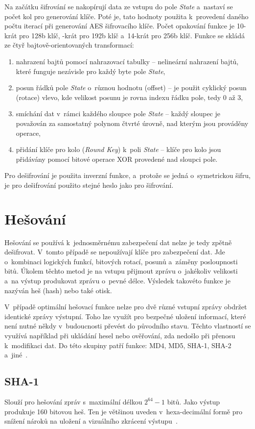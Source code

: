 Na začátku šifrování se nakopírují data ze vstupu do pole {\it State} a~nastaví se počet kol pro
generování klíče. Poté je, tato hodnoty použita k~provedení daného počtu iterací při generování AES
šifrovacího klíče. Počet opakování funkce je 10-krát pro 128b klíč, -krát pro 192b klíč a~14-krát
pro 256b klíč. Funkce se skládá ze čtyř bajtově-orientovaných transformací:
    \begin{enumerate}
    \item nahrazení bajtů pomocí nahrazovací tabulky -- nelineární nahrazení bajtů, které funguje
        nezávisle pro každý byte pole {\it State},
    \item posun řádků pole {\it State} o~různou hodnotu (offset) -- je použit cyklický posun
        (rotace) vlevo, kde velikost posunu je rovna indexu řádku pole, tedy 0 až 3,
    \item smíchání dat v~rámci každého sloupce pole {\it State} -- každý sloupec je považován za
        samostatný polynom čtvrté úrovně, nad kterým jsou prováděny operace,
    \item přidání klíče pro kolo ({\it Round Key}) k~poli {\it State} -- klíče pro kolo jsou
	přidávány pomocí bitové operace XOR provedené nad sloupci pole.
\end{enumerate}
Pro dešifrování je použita inverzní funkce, a~protože se jedná o~symetrickou šifru, je pro dešifrování
použito stejné heslo jako pro šifrování.

\section{Hešování}
Hešování se používá k~jednosměrnému zabezpečení dat nelze je tedy zpětně dešifrovat. V~tomto případě
se nepoužívají klíče pro zabezpečení dat. Jde o~kombinaci logických funkcí, bitových rotací, posunů
a~záměny posloupnosti bitů. Úkolem těchto metod je na vstupu přijmout zprávu o~jakékoliv velikosti
a~na výstup produkovat zprávu o~pevné délce. Výsledek takovéto funkce je nazýván heš (hash) nebo
také otisk. 

 V~případě optimální hešovací funkce nelze pro dvě různé vstupní zprávy obdržet identické zprávy
výstupní. Toho lze využít pro bezpečné uložení informací, které není nutné někdy v~budoucnosti
převést do původního stavu. Těchto vlastností se využívá například při ukládání hesel nebo
ověřování, zda nedošlo při přenosu k~modifikaci dat. Do této skupiny patří funkce: MD4, MD5, SHA-1,
SHA-2 a~jiné~\cite{AC:1996}.

\subsection{SHA-1}
Slouží pro hešování zpráv s~maximální délkou $2^{64}-1$ bitů. Jako výstup produkuje 160 bitovou
heš. Ten je většinou uveden v~hexa-decimální formě pro snížení nároků na uložení
a vizuálního zkrácení výstupu~\cite{NIST:2015}. 

